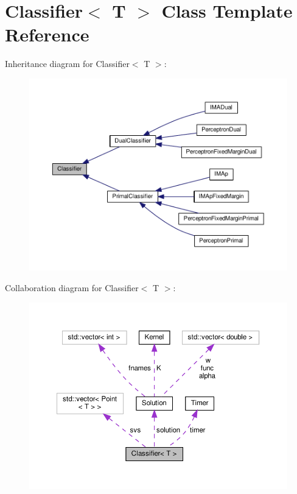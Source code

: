 \hypertarget{class_classifier}{}\section{Classifier$<$ T $>$ Class Template Reference}
\label{class_classifier}


Inheritance diagram for Classifier$<$ T $>$\+:
\nopagebreak
\begin{figure}[H]
\begin{center}
\leavevmode
\includegraphics[width=350pt]{class_classifier__inherit__graph}
\end{center}
\end{figure}


Collaboration diagram for Classifier$<$ T $>$\+:
\nopagebreak
\begin{figure}[H]
\begin{center}
\leavevmode
\includegraphics[width=350pt]{class_classifier__coll__graph}
\end{center}
\end{figure}
